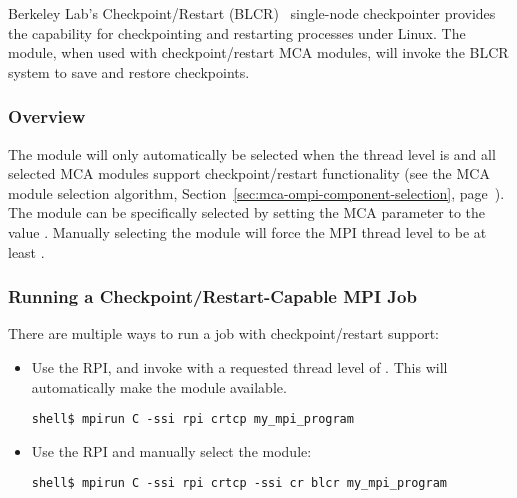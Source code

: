 Berkeley Lab's Checkpoint/Restart (BLCR)~\cite{BLCR02} single-node
checkpointer provides the capability for checkpointing and restarting
processes under Linux.  The  module, when used with
checkpoint/restart MCA modules, will invoke the BLCR system to save
and restore checkpoints.


\subsubsection{Overview}

The  module will only automatically be selected when the
thread level is  and all
selected MCA modules support checkpoint/restart functionality (see the
MCA module selection algorithm,
Section~\ref{sec:mca-ompi-component-selection},
page~\pageref{sec:mca-ompi-component-selection}).  The  module
can be specifically selected by setting the  MCA
parameter to the value .  Manually selecting the
 module will force the MPI thread level to be at least
.


\subsubsection{Running a Checkpoint/Restart-Capable MPI Job}

There are multiple ways to run a job with checkpoint/restart support:

\begin{itemize}
\item Use the  RPI, and invoke
   with a requested thread level of
  .  This will automatically
  make the  module available.

\lstset{style=lam-cmdline}
\begin{lstlisting}
shell$ mpirun C -ssi rpi crtcp my_mpi_program
\end{lstlisting}
  
\item Use the  RPI and manually select the 
  module:

\lstset{style=lam-cmdline}
\begin{lstlisting}
shell$ mpirun C -ssi rpi crtcp -ssi cr blcr my_mpi_program
\end{lstlisting}
\end{itemize}

